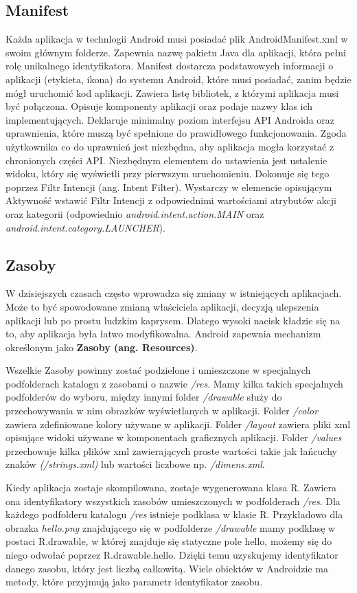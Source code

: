 \documentclass{article}
\numberwithin{equation}{section}
\begin{document}
\subsection{Manifest}
Każda aplikacja w technlogii Android musi posiadać plik AndroidManifest.xml w swoim głównym folderze. Zapewnia nazwę pakietu Java dla aplikacji, która pełni rolę unikalnego identyfikatora. Manifest dostarcza podstawowych informacji o aplikacji (etykieta, ikona) do systemu Android, które musi posiadać, zanim będzie mógł uruchomić kod aplikacji.  Zawiera listę bibliotek, z którymi aplikacja musi być połączona. Opisuje komponenty aplikacji oraz podaje nazwy klas ich implementujących. Deklaruje minimalny poziom interfejsu API Androida oraz uprawnienia, które muszą być spełnione do prawidłowego funkcjonowania. Zgoda użytkownika co do uprawnień jest niezbędna, aby aplikacja mogła korzystać z chronionych części API. Niezbędnym elementem do ustawienia jest ustalenie widoku, który się wyświetli przy pierwszym uruchomieniu. Dokonuje się tego poprzez Filtr Intencji (ang. Intent Filter). Wystarczy w elemencie opisującym Aktywność wstawić Filtr Intencji z odpowiednimi wartościami atrybutów akcji oraz kategorii (odpowiednio \textit{android.intent.action.MAIN} oraz \textit{android.intent.category.LAUNCHER}).\citep{manifest}
\subsection{Zasoby}
W dzisiejszych czasach często wprowadza się zmiany w istniejących aplikacjach. Może to być spowodowane zmianą właściciela aplikacji, decyzją ulepszenia aplikacji lub po prostu ludzkim kaprysem. Dlatego wysoki nacisk kładzie się na to, aby aplikacja była łatwo modyfikowalna. Android zapewnia mechanizm określonym jako \textbf{Zasoby (ang. Resources)}.\par Wszelkie Zasoby powinny zostać podzielone i umieszczone w specjalnych podfolderach katalogu z zasobami o nazwie \textit{/res}. Mamy kilka takich specjalnych podfolderów do wyboru, między innymi folder \textit{/drawable} służy do przechowywania w nim obrazków wyświetlanych w aplikacji. Folder \textit{/color} zawiera zdefiniowane kolory używane w aplikacji. Folder \textit{/layout} zawiera pliki xml opisujące widoki używane w komponentach graficznych aplikacji. Folder \textit{/values} przechowuje kilka plików xml zawierających proste wartości takie jak łańcuchy znaków \textit{(/strings.xml)} lub wartości liczbowe np. \textit{/dimens.xml}.\citep{providing_resources}\par Kiedy aplikacja zostaje skompilowana, zostaje wygenerowana klasa R. Zawiera ona identyfikatory wszystkich zasobów umieszczonych w podfolderach \textit{/res}. Dla każdego podfolderu katalogu \textit{/res} istnieje podklasa w klasie R. Przykładowo dla obrazka \textit{hello.png} znajdującego się w podfolderze \textit{/drawable} mamy podklasę w postaci R.drawable, w której znajduje się statyczne pole hello, możemy się do niego odwołać poprzez R.drawable.hello. Dzięki temu uzyskujemy identyfikator danego zasobu, który jest liczbą całkowitą. Wiele obiektów w Androidzie ma metody, które przyjmują jako parametr identyfikator zasobu.\citep{accessing_resources}
\end{document}
